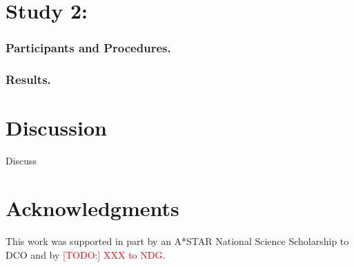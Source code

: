 \documentclass[10pt,letterpaper]{article}
\newcommand{\red}[1]{\textcolor{Red}{#1}}
\begin{document}
\section{Study 2: }


\subsubsection{Participants and Procedures.} 






\subsubsection{Results.} 





\section{Discussion}

Discuss

\section{Acknowledgments}

This work was supported in part by an A*STAR National Science Scholarship to DCO and by \red{[TODO:] XXX to NDG}.




\setlength{\bibleftmargin}{.125in}
\setlength{\bibindent}{-\bibleftmargin}


\end{document}
